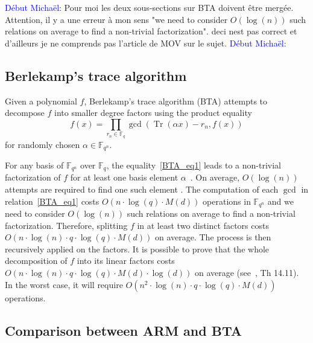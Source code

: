 \documentclass{sig-alternate}
\newcommand{\ff}[1]{\mathbb{F}_{#1}}
\newcommand{\fq}{\ff{q}}
\newcommand{\fqn}{\ff{q^n}}
\newcommand{\qq}{q}
\newcommand{\nn}{n}
\newcommand{\qn}{{\qq^\nn}}
\newcommand{\basef}{\ff{\qq}}
\newcommand{\extf}{\ff{\qn}}
\DeclareMathOperator{\Tr}{Tr}
\newcommand{\bigO}{O}
\newcounter{algo}
\newcommand{\comd}{\noindent \textcolor{blue}{D\'ebut Micha\"el}:}
\newtheorem{Lem}{Lemma}
\begin{document}
\comd
Pour moi les deux sous-sections sur BTA doivent \^etre merg\'ee. Attention, il y a une erreur \`a mon sens 
"we need to consider $\bigO(\log(n))$ such relations on average to find a non-trivial factorization". deci nest pas correct et d'ailleurs je ne comprends pas l'article de MOV sur le sujet. 
\comd
\subsection{Berlekamp's trace algorithm}

Given a polynomial $f$, Berlekamp's trace algorithm (BTA) attempts to decompose $f$ into smaller degree factors using the product equality
\begin{equation}\label{BTA_eq1}
f(x)=\prod_{r_n\in\fq}\gcd\left(\Tr(\alpha x)-r_n,f(x)\right)
\end{equation}
for randomly chosen $\alpha\in\fqn$.



%
For any basis of $\extf$ over $\basef$, the equality~\eqref{BTA_eq1} leads to a non-trivial factorization of $f$ for at least one basis element $\alpha$~\cite{berl70}.
% 
On average, $\bigO(\log(n))$ attempts are required to find one such element \cite{Menvanovans92}. The computation of each $\gcd$ in relation~\eqref{BTA_eq1} costs $\bigO(n \cdot \log(q) \cdot M(d))$ operations in $\extf$ and we need to consider $\bigO(\log(n))$ such relations on average to find a non-trivial factorization. Therefore, 
splitting $f$ in at least two distinct factors costs $\bigO(n \cdot \log(n) \cdot  q \cdot \log(q) \cdot M(d))$ on average. The process is then recursively applied on the factors. It is possible to prove that the whole decomposition of $f$ into its linear factors costs $\bigO(n  \cdot \log(n) \cdot q \cdot \log(q) \cdot M(d) \cdot \log(d))$ on average (see~\cite{Gathen2003}, Th 14.11). In the worst case, it will require $\bigO(n^2 \cdot \log(n) \cdot q \cdot \log(q) \cdot M(d) )$ operations.



\subsection{Comparison between ARM and BTA}
\end{document}
